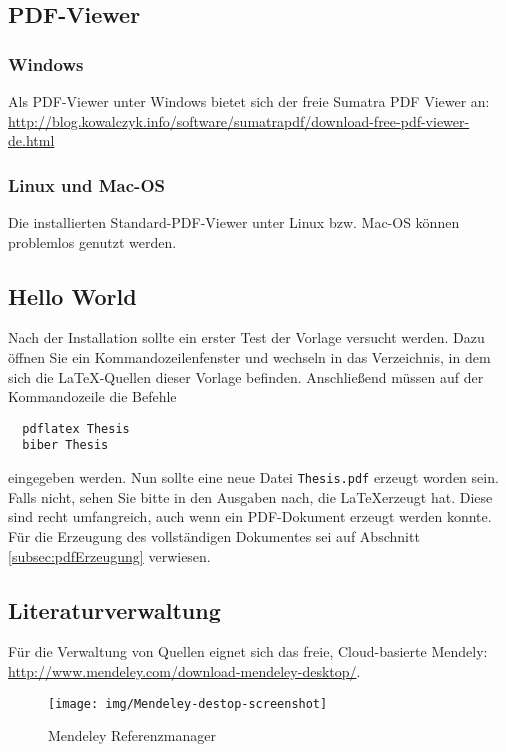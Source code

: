 \subsection{PDF-Viewer}

\subsubsection{Windows}

Als PDF-Viewer unter Windows bietet sich der freie Sumatra PDF Viewer an: \url{http://blog.kowalczyk.info/software/sumatrapdf/download-free-pdf-viewer-de.html}

\subsubsection{Linux und Mac-OS}

Die installierten Standard-PDF-Viewer unter Linux bzw. Mac-OS können problemlos genutzt werden.

\subsection{Hello World}
Nach der Installation sollte ein erster Test der Vorlage versucht werden. Dazu öffnen Sie ein Kommandozeilenfenster und wechseln in das Verzeichnis, in dem sich die {\LaTeX}-Quellen dieser Vorlage befinden. Anschließend müssen auf der Kommandozeile die Befehle 
\begin{lstlisting}
  pdflatex Thesis
  biber Thesis
\end{lstlisting}
eingegeben werden. Nun sollte eine neue Datei \texttt{Thesis.pdf} erzeugt worden sein. Falls nicht, sehen Sie bitte in den Ausgaben nach, die \LaTeX erzeugt hat. Diese sind recht umfangreich, auch wenn ein PDF-Dokument erzeugt werden konnte. Für die Erzeugung des vollständigen Dokumentes sei auf Abschnitt \ref{subsec:pdfErzeugung} verwiesen.


\subsection{Literaturverwaltung}

Für die Verwaltung von Quellen eignet sich das freie, Cloud-basierte Mendely: \url{http://www.mendeley.com/download-mendeley-desktop/}. 

\begin{figure}[hbt]
\centering
\begin{minipage}[t]{1\textwidth} %
\caption{Mendeley Referenzmanager} %
\texttt{[image: img/Mendeley-destop-screenshot]}\\ %
\end{minipage}
\end{figure}

